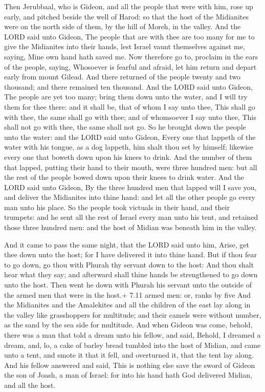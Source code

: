 Then Jerubbaal, who is Gideon, and all the people that were
with him, rose up early, and pitched beside the well of Harod: so that
the host of the Midianites were on the north side of them, by the hill
of Moreh, in the valley.  And the LORD said unto Gideon, The
people that are with thee are too many for me to give the Midianites
into their hands, lest Israel vaunt themselves against me, saying, Mine
own hand hath saved me.  Now therefore go to, proclaim in
the ears of the people, saying, Whosoever is fearful and afraid, let him
return and depart early from mount Gilead. And there returned of the
people twenty and two thousand; and there remained ten thousand.
 And the LORD said unto Gideon, The people are yet too many;
bring them down unto the water, and I will try them for thee there: and
it shall be, that of whom I say unto thee, This shall go with thee, the
same shall go with thee; and of whomsoever I say unto thee, This shall
not go with thee, the same shall not go.  So he brought down
the people unto the water: and the LORD said unto Gideon, Every one that
lappeth of the water with his tongue, as a dog lappeth, him shalt thou
set by himself; likewise every one that boweth down upon his knees to
drink.  And the number of them that lapped, putting their
hand to their mouth, were three hundred men: but all the rest of the
people bowed down upon their knees to drink water.  And the
LORD said unto Gideon, By the three hundred men that lapped will I save
you, and deliver the Midianites into thine hand: and let all the other
people go every man unto his place.  So the people took
victuals in their hand, and their trumpets: and he sent all the rest of
Israel every man unto his tent, and retained those three hundred men:
and the host of Midian was beneath him in the valley.

 And it came to pass the same night, that the LORD said
unto him, Arise, get thee down unto the host; for I have delivered it
into thine hand.  But if thou fear to go down, go thou with
Phurah thy servant down to the host:  And thou shalt hear
what they say; and afterward shall thine hands be strengthened to go
down unto the host. Then went he down with Phurah his servant unto the
outside of the armed men that were in the host.+ 7.11 armed men: or,
ranks by five  And the Midianites and the Amalekites and
all the children of the east lay along in the valley like grasshoppers
for multitude; and their camels were without number, as the sand by the
sea side for multitude.  And when Gideon was come, behold,
there was a man that told a dream unto his fellow, and said, Behold, I
dreamed a dream, and, lo, a cake of barley bread tumbled into the host
of Midian, and came unto a tent, and smote it that it fell, and
overturned it, that the tent lay along.  And his fellow
answered and said, This is nothing else save the sword of Gideon the son
of Joash, a man of Israel: for into his hand hath God delivered Midian,
and all the host.


